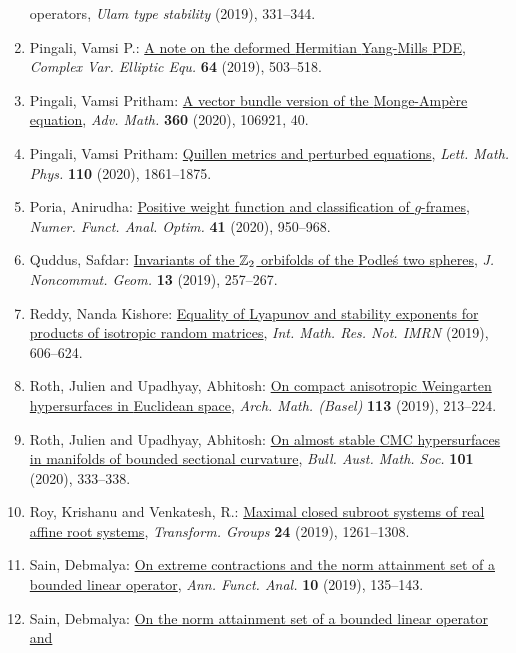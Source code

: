 \begin{enumerate}
operators, \emph{Ulam type stability} {\bf } (2019), 331--344.
\item Pingali, Vamsi P.: \href{https://doi.org/10.1080/17476933.2018.1454914}{A note on the deformed {H}ermitian {Y}ang-{M}ills {PDE}}, \emph{Complex Var. Elliptic Equ.} {\bf 64} (2019), 503--518.
\item Pingali, Vamsi Pritham: \href{https://doi.org/10.1016/j.aim.2019.106921}{A vector bundle version of the {M}onge-{A}mp\`ere equation}, \emph{Adv. Math.} {\bf 360} (2020), 106921, 40.
\item Pingali, Vamsi Pritham: \href{https://doi.org/10.1007/s11005-020-01279-9}{Quillen metrics and perturbed equations}, \emph{Lett. Math. Phys.} {\bf 110} (2020), 1861--1875.
\item Poria, Anirudha: \href{https://doi.org/10.1080/01630563.2020.1728771}{Positive weight function and classification of {$g$}-frames}, \emph{Numer. Funct. Anal. Optim.} {\bf 41} (2020), 950--968.
\item Quddus, Safdar: \href{https://doi.org/10.4171/JNCG/320}{Invariants of the {$\Bbb Z_2$} orbifolds of the {P}odle\'{s} two
spheres}, \emph{J. Noncommut. Geom.} {\bf 13} (2019), 257--267.
\item Reddy, Nanda Kishore: \href{https://doi.org/10.1093/imrn/rnx134}{Equality of {L}yapunov and stability exponents for products of
isotropic random matrices}, \emph{Int. Math. Res. Not. IMRN} {\bf } (2019), 606--624.
\item Roth, Julien and Upadhyay, Abhitosh: \href{https://doi.org/10.1007/s00013-019-01315-8}{On compact anisotropic {W}eingarten hypersurfaces in
{E}uclidean space}, \emph{Arch. Math. (Basel)} {\bf 113} (2019), 213--224.
\item Roth, Julien and Upadhyay, Abhitosh: \href{https://doi.org/10.1017/s0004972719000935}{On almost stable {CMC} hypersurfaces in manifolds of bounded
sectional curvature}, \emph{Bull. Aust. Math. Soc.} {\bf 101} (2020), 333--338.
\item Roy, Krishanu and Venkatesh, R.: \href{https://doi.org/10.1007/s00031-018-9510-9}{Maximal closed subroot systems of real affine root systems}, \emph{Transform. Groups} {\bf 24} (2019), 1261--1308.
\item Sain, Debmalya: \href{https://doi.org/10.1215/20088752-2018-0014}{On extreme contractions and the norm attainment set of a
bounded linear operator}, \emph{Ann. Funct. Anal.} {\bf 10} (2019), 135--143.
\item Sain, Debmalya: \href{https://doi.org/10.1007/s13226-020-0393-9}{On the norm attainment set of a bounded linear operator and
}
\end{enumerate}
